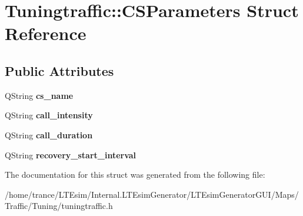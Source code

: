 \hypertarget{struct_tuningtraffic_1_1_c_s_parameters}{}\section{Tuningtraffic\+:\+:C\+S\+Parameters Struct Reference}
\label{struct_tuningtraffic_1_1_c_s_parameters}
\subsection*{Public Attributes}
\begin{DoxyCompactItemize}
\item 
Q\+String {\bfseries cs\+\_\+name}\hypertarget{struct_tuningtraffic_1_1_c_s_parameters_a2ddf44c8f2997c270cf26e3648de2bce}{}\label{struct_tuningtraffic_1_1_c_s_parameters_a2ddf44c8f2997c270cf26e3648de2bce}

\item 
Q\+String {\bfseries call\+\_\+intensity}\hypertarget{struct_tuningtraffic_1_1_c_s_parameters_adb9bce9f12ee7c1e3e2ece6160516a56}{}\label{struct_tuningtraffic_1_1_c_s_parameters_adb9bce9f12ee7c1e3e2ece6160516a56}

\item 
Q\+String {\bfseries call\+\_\+duration}\hypertarget{struct_tuningtraffic_1_1_c_s_parameters_a4cc74ce2f1b792e0ab1565e6403fa7d8}{}\label{struct_tuningtraffic_1_1_c_s_parameters_a4cc74ce2f1b792e0ab1565e6403fa7d8}

\item 
Q\+String {\bfseries recovery\+\_\+start\+\_\+interval}\hypertarget{struct_tuningtraffic_1_1_c_s_parameters_ab4629cdde3c1f7c52a5df484aa5c2c9e}{}\label{struct_tuningtraffic_1_1_c_s_parameters_ab4629cdde3c1f7c52a5df484aa5c2c9e}

\end{DoxyCompactItemize}


The documentation for this struct was generated from the following file\+:\begin{DoxyCompactItemize}
\item 
/home/trance/\+L\+T\+Esim/\+Internal.\+L\+T\+Esim\+Generator/\+L\+T\+Esim\+Generator\+G\+U\+I/\+Maps/\+Traffic/\+Tuning/tuningtraffic.\+h\end{DoxyCompactItemize}
